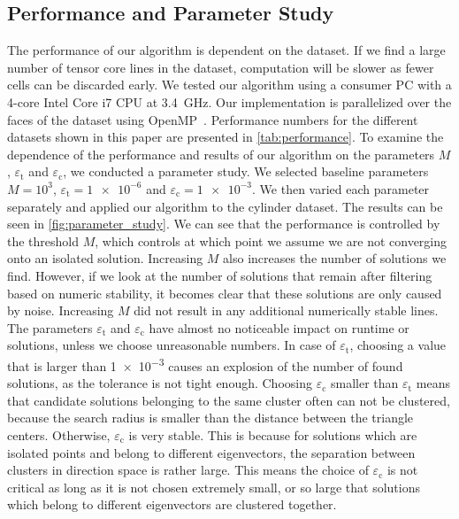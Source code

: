 \subsection{Performance and Parameter Study} %
\label{sub:performance}
%
The performance of our algorithm is dependent on the dataset.
%
If we find a large number of tensor core lines in the dataset, computation
will be slower as fewer cells can be discarded early.
%
We tested our algorithm using a consumer PC with a 4-core Intel Core i7 CPU at
\SI{3.4}{\giga\hertz}.
%
Our implementation is parallelized over the faces of the dataset using
OpenMP~\cite{OMP2013}.
%
Performance numbers for the different datasets shown in this paper are presented
in \cref{tab:performance}.
%
To examine the dependence of the performance and results of our algorithm on the
parameters $M$, $\varepsilon_{\mathrm{t}}$ and $\varepsilon_{\mathrm{c}}$, we
conducted a parameter study.
%
We selected baseline parameters $M = 10^3$, $\varepsilon_{\mathrm{t}} =
\num{1e-6}$ and $\varepsilon_{\mathrm{c}} = \num{1e-3}$.
%
We then varied each parameter separately and applied our algorithm to the
cylinder dataset.
%
The results can be seen in \cref{fig:parameter_study}.
%
We can see that the performance is controlled by the threshold $M$, which
controls at which point we assume we are not converging onto an isolated
solution.
%
Increasing $M$ also increases the number of solutions we find.
%
However, if we look at the number of solutions that remain after filtering based
on numeric stability, it becomes clear that these solutions are only caused by
noise.
%
Increasing $M$ did not result in any additional numerically stable lines.
%
The parameters $\varepsilon_{\mathrm{t}}$ and $\varepsilon_{\mathrm{c}}$ have
almost no noticeable impact on runtime or solutions, unless we choose
unreasonable numbers.
%
In case of $\varepsilon_{\mathrm{t}}$, choosing a value that is larger than
\num{1e-3} causes an explosion of the number of found solutions, as the
tolerance is not tight enough.
%
Choosing $\varepsilon_{\mathrm{c}}$ smaller than $\varepsilon_{\mathrm{t}}$
means that candidate solutions belonging to the same cluster often can not be
clustered, because the search radius is smaller than the distance between the
triangle centers.
%
Otherwise, $\varepsilon_{\mathrm{c}}$ is very stable.
%
This is because for solutions which are isolated points and belong to different
eigenvectors, the separation between clusters in direction space is rather
large.
This means the choice of $\varepsilon_{\mathrm{c}}$ is not critical as
long as it is not chosen extremely small, or so large that solutions
which belong to different eigenvectors are clustered together.

